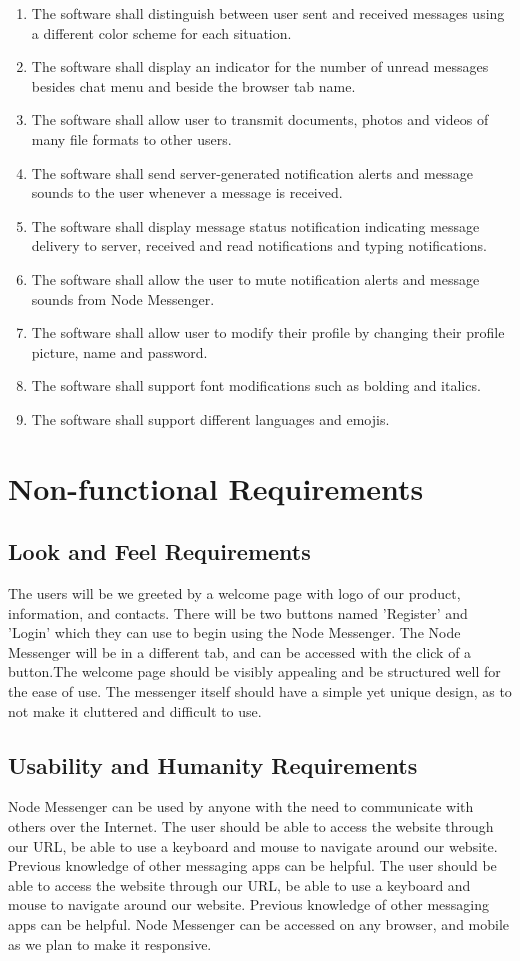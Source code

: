 \documentclass[12pt, titlepage]{article}
\begin{document}
\begin{enumerate}
		    \item The software shall distinguish between user sent and received messages using a different color scheme for each situation.
		    \item The software shall display an indicator for the number of unread messages besides chat menu and beside the browser tab name.
		    \item The software shall allow user to transmit documents, photos and videos of many file formats to other users.
		    \item The software shall send server-generated notification alerts and message sounds to the user whenever a message is received.
		    \item The software shall display message status notification indicating message delivery to server, received and read notifications and typing notifications.
		    \item The software shall allow the user to mute notification alerts and message sounds from Node Messenger.
		    \item The software shall allow user to modify their profile by changing their profile picture, name and password.
		    \item The software shall support font modifications such as bolding and italics.
		    \item The software shall support different languages and emojis.
		\end{enumerate}
	\newpage
    \section{Non-functional Requirements}

    	\subsection{Look and Feel Requirements}
    	The users will be we greeted by a welcome page with logo of our product, information, and contacts. There will be two buttons named 'Register' and 'Login' which they can use to begin using the Node Messenger. The Node Messenger will be in a different tab, and can be accessed with the click of a button.The welcome page should be visibly appealing and be structured well for the ease of use. The messenger itself should have a simple yet unique design, as to not make it cluttered and difficult to use.

    	\subsection{Usability and Humanity Requirements}
		Node Messenger can be used by anyone with the need to communicate with others over the Internet. The user should be able to access the website through our URL, be able to use a keyboard and mouse to navigate around our website. Previous knowledge of other messaging apps can be helpful. The user should be able to access the website through our URL, be able to use a keyboard and mouse to navigate around our website. Previous knowledge of other messaging apps can be helpful. Node Messenger can be accessed on any browser, and mobile as we plan to make it responsive.
\end{document}
